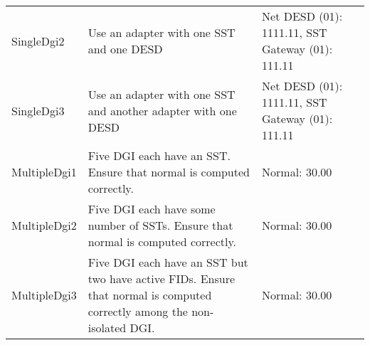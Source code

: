 \documentclass{article}
\begin{document}
\begin{center}
\begin{footnotesize}
\begin{longtable}{|p{3cm}|p{4cm}|p{10cm}|c|}
    SingleDgi2 & Use an adapter with one SST and one DESD & Net DESD (01): 1111.11, SST Gateway (01): 111.11 & \\
    SingleDgi3 & Use an adapter with one SST and another adapter with one DESD & Net DESD (01): 1111.11, SST Gateway (01): 111.11 & \\
    MultipleDgi1 & Five DGI each have an SST. Ensure that normal is computed correctly. & Normal: 30.00 & \\
    MultipleDgi2 & Five DGI each have some number of SSTs. Ensure that normal is computed correctly. & Normal: 30.00 & \\
    MultipleDgi3 & Five DGI each have an SST but two have active FIDs. Ensure that normal is computed correctly among the non-isolated DGI. & Normal: 30.00 & \\
\end{longtable}
\end{footnotesize}
\end{center}
\end{document}

